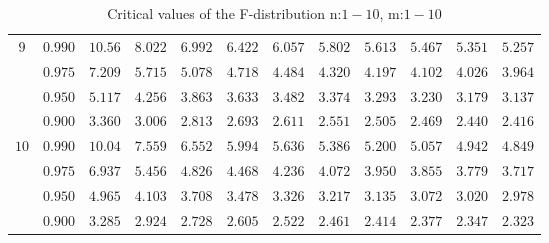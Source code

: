 \documentclass[11pt]{article}
\theoremstyle{definition}
\begin{document}
\begin{table}[H]
\begin{tabularx}{\linewidth}{c | c | c c c c c c c c c c}
		$9$ & $0.990$ & $10.56$ & $8.022$ & $6.992$ & $6.422$ & $6.057$ & $5.802$ & $5.613$ & $5.467$ & $5.351$ & $5.257$ \\
		& $0.975$ & $7.209$ & $5.715$ & $5.078$ & $4.718$ & $4.484$ & $4.320$ & $4.197$ & $4.102$ & $4.026$ & $3.964$ \\
		& $0.950$ & $5.117$ & $4.256$ & $3.863$ & $3.633$ & $3.482$ & $3.374$ & $3.293$ & $3.230$ & $3.179$ & $3.137$ \\
		& $0.900$ & $3.360$ & $3.006$ & $2.813$ & $2.693$ & $2.611$ & $2.551$ & $2.505$ & $2.469$ & $2.440$ & $2.416$ \\
		$10$ & $0.990$ & $10.04$ & $7.559$ & $6.552$ & $5.994$ & $5.636$ & $5.386$ & $5.200$ & $5.057$ & $4.942$ & $4.849$ \\
		& $0.975$ & $6.937$ & $5.456$ & $4.826$ & $4.468$ & $4.236$ & $4.072$ & $3.950$ & $3.855$ & $3.779$ & $3.717$ \\
		& $0.950$ & $4.965$ & $4.103$ & $3.708$ & $3.478$ & $3.326$ & $3.217$ & $3.135$ & $3.072$ & $3.020$ & $2.978$ \\
		& $0.900$ & $3.285$ & $2.924$ & $2.728$ & $2.605$ & $2.522$ & $2.461$ & $2.414$ & $2.377$ & $2.347$ & $2.323$
	\end{tabularx}
	\caption{Critical values of the F-distribution n:$1-10$, m:$1-10$}
	\label{tbl:Fdistribution}
\end{table}
\end{document}
